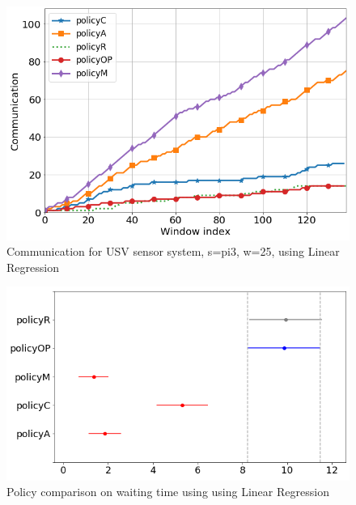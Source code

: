 \documentclass{mpaper}
\begin{document}
\begin{figure}[h]
    \centering
    \includegraphics[scale=0.33]{imgs/comm_lin_reg_pi3.png}
    \caption{Communication for USV sensor system, s=pi3, w=25, using Linear Regression}
    \label{fig:err_lin_reg_pi4}
\end{figure}
\begin{figure}[t!]
    \centering
    \includegraphics[scale=0.35]{imgs/lin_reg_pi3_waiting_plot_diff_means.png}
    \caption{Policy comparison on waiting time using using Linear Regression}
    \label{fig:lin_reg_pi3_waiting_plot_diff_means}
\end{figure}
\end{document}
